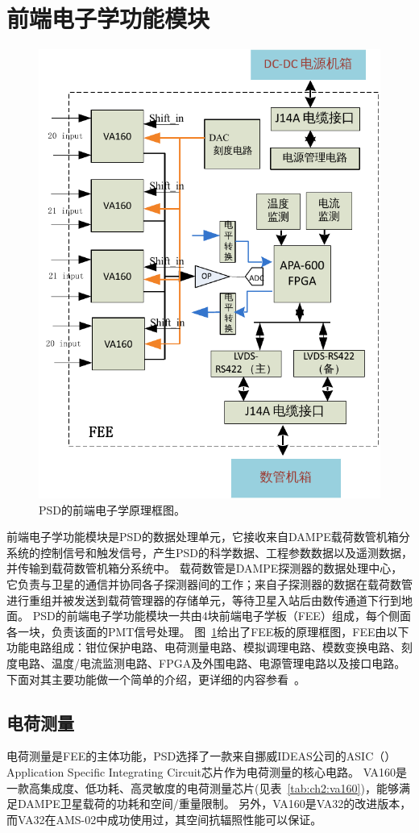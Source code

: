 \section{前端电子学功能模块}
\label{sec:psd_electronics}
\begin{figure}[t]
	\centering
	\includegraphics[width=0.7\linewidth]{chap/description/fig/psd_fee1}
	\caption{PSD的前端电子学原理框图。}
	\label{fig:ch2:psd_fee1}
\end{figure}

前端电子学功能模块是PSD的数据处理单元，它接收来自DAMPE载荷数管机箱分系统的控制信号和触发信号，产生PSD的科学数据、工程参数数据以及遥测数据，并传输到载荷数管机箱分系统中。
载荷数管是DAMPE探测器的数据处理中心，它负责与卫星的通信并协同各子探测器间的工作；来自子探测器的数据在载荷数管进行重组并被发送到载荷管理器的存储单元，等待卫星入站后由数传通道下行到地面。
PSD的前端电子学功能模块一共由4块前端电子学板（FEE）组成，每个侧面各一块，负责该面的PMT信号处理。
图~\ref{fig:ch2:psd_fee1}给出了FEE板的原理框图，FEE由以下功能电路组成：钳位保护电路、电荷测量电路、模拟调理电路、模数变换电路、刻度电路、温度/电流监测电路、FPGA及外围电路、电源管理电路以及接口电路。
下面对其主要功能做一个简单的介绍，更详细的内容参看~\parencite{yanghaibo_thesis,psd_tdr}。

\subsection{电荷测量}
电荷测量是FEE的主体功能，PSD选择了一款来自挪威IDEAS公司的ASIC（）Application Specific  Integrating Circuit芯片作为电荷测量的核心电路。
VA160是一款高集成度、低功耗、高灵敏度的电荷测量芯片(见表~\ref{tab:ch2:va160})，能够满足DAMPE卫星载荷的功耗和空间/重量限制。
另外，VA160是VA32的改进版本，而VA32在AMS-02中成功使用过，其空间抗辐照性能可以保证。

